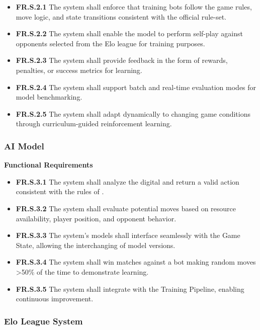 \documentclass{article}
\begin{document}
\begin{itemize}
  \item \label{FR.S.2.1}\textbf{FR.S.2.1} The system shall enforce that training bots follow the game rules, move logic, and state transitions consistent with the official \emph{\Catan{}} rule-set.
  \item \label{FR.S.2.2}\textbf{FR.S.2.2} The system shall enable the \AI{} model to perform self-play against opponents selected from the Elo league for training purposes.
  \item \label{FR.S.2.3}\textbf{FR.S.2.3} The system shall provide feedback in the form of rewards, penalties, or success metrics for learning.
  \item \label{FR.S.2.4}\textbf{FR.S.2.4} The system shall support batch and real-time evaluation modes for model benchmarking.
  \item \label{FR.S.2.5}\textbf{FR.S.2.5} The system shall adapt dynamically to changing game conditions through curriculum-guided reinforcement learning.
\end{itemize}


\subsubsection{AI Model}

\textbf{Functional Requirements}

\begin{itemize}
  \item \label{FR.S.3.1}\textbf{FR.S.3.1} The system shall analyze the digital \GameState{} and return a valid action consistent with the rules of \emph{\Catan{}}.
  \item \label{FR.S.3.2}\textbf{FR.S.3.2} The system shall evaluate potential moves based on resource availability, player position, and opponent behavior.
  \item \label{FR.S.3.3}\textbf{FR.S.3.3} The system's models shall interface seamlessly with the Game State, allowing the interchanging of model versions.
  \item \label{FR.S.3.4}\textbf{FR.S.3.4} The system shall win matches against a bot making random moves \textgreater50\% of the time to demonstrate learning.
  \item \label{FR.S.3.5}\textbf{FR.S.3.5} The system shall integrate with the Training Pipeline, enabling continuous improvement.
\end{itemize}

\subsubsection{Elo League System}
\end{document}
